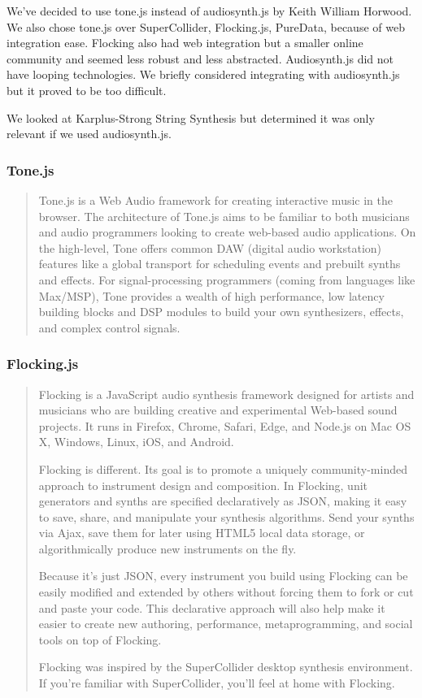 \documentclass[12pt,a4paper]{article}
\begin{document}
We've decided to use tone.js instead of audiosynth.js by Keith William Horwood. We also chose tone.js over SuperCollider, Flocking.js, PureData, because of web integration ease. Flocking also had web integration but a smaller online community and seemed less robust and less abstracted. Audiosynth.js did not have looping technologies. We briefly considered integrating with audiosynth.js but it proved to be too difficult.

We looked at Karplus-Strong String Synthesis but determined it was only relevant if we used audiosynth.js.

\subsubsection{Tone.js}

\begin{quote}
Tone.js is a Web Audio framework for creating interactive music in the browser. The architecture of Tone.js aims to be familiar to both musicians and audio programmers looking to create web-based audio applications. On the high-level, Tone offers common DAW (digital audio workstation) features like a global transport for scheduling events and prebuilt synths and effects. For signal-processing programmers (coming from languages like Max/MSP), Tone provides a wealth of high performance, low latency building blocks and DSP modules to build your own synthesizers, effects, and complex control signals. \cite{tonejs}
\end{quote}

\subsubsection{Flocking.js}

\begin{quote}
Flocking is a JavaScript audio synthesis framework designed for artists and musicians who are building creative and experimental Web-based sound projects. It runs in Firefox, Chrome, Safari, Edge, and Node.js on Mac OS X, Windows, Linux, iOS, and Android.

Flocking is different. Its goal is to promote a uniquely community-minded approach to instrument design and composition. In Flocking, unit generators and synths are specified declaratively as JSON, making it easy to save, share, and manipulate your synthesis algorithms. Send your synths via Ajax, save them for later using HTML5 local data storage, or algorithmically produce new instruments on the fly.

Because it's just JSON, every instrument you build using Flocking can be easily modified and extended by others without forcing them to fork or cut and paste your code. This declarative approach will also help make it easier to create new authoring, performance, metaprogramming, and social tools on top of Flocking.

Flocking was inspired by the SuperCollider desktop synthesis environment. If you're familiar with SuperCollider, you'll feel at home with Flocking. \cite{flocking}
\end{quote}
\end{document}
